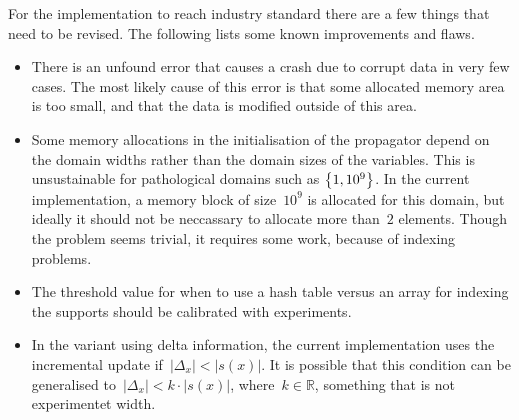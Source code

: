 \documentclass[a4paper,11pt]{article}
\newcommand{\Chapref}[1]{Section~\ref{#1}}
\numberwithin{equation}{section}
\begin{document}
For the implementation to reach industry standard there
are a few things that need to be revised. The following lists some known
improvements and flaws.

\begin{itemize}
  \item There is an unfound error that causes a crash due to corrupt data 
    in very few cases.
    The most likely cause of this error is that some allocated memory area
    is too small, and that the data is modified outside of this area.
    
  \item Some memory allocations in the initialisation of the propagator
    depend on the domain widths rather
    than the domain sizes of the variables. This is unsustainable
    for pathological domains such as $\left\{1, 10^9\right\}$. In the current
    implementation, a memory block of size~$10^9$ is allocated for this
    domain, but ideally it should not be neccassary to allocate more than~$2$
    elements. Though the problem seems trivial, it requires some
    work, because of indexing problems.

  \item The threshold value for when to use a hash table versus
    an array for indexing the supports should be calibrated with
    experiments.

  \item In the variant using delta information, the current implementation
    uses the incremental update if~$|\Delta_x| < |s(x)|$. It is possible
    that this condition can be generalised to~$|\Delta_x| < k \cdot |s(x)|$,
    where~$k \in \mathbb{R}$, something that is not experimentet width.

\end{itemize}






\end{document}
